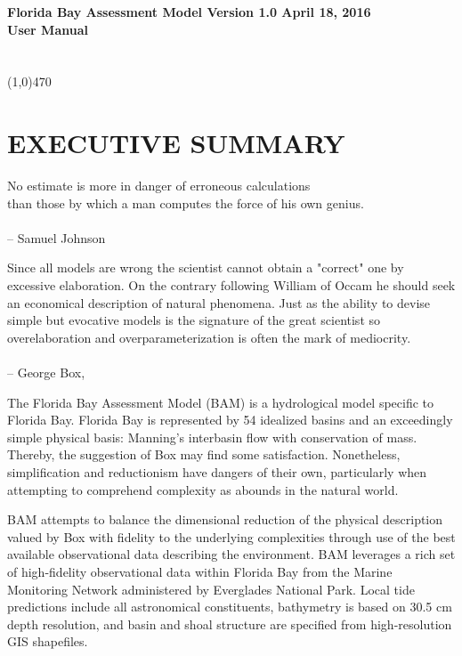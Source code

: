 \sffamily
\Large
\noindent\textbf{Florida Bay Assessment Model Version 1.0 April 18, 2016}
\\[0.1in]
\noindent\textbf{User Manual}
\\[0.1in]
\normalsize
{}
\\[0.05in]
\\[0.1in]
\noindent\line(1,0){470}

\section*{EXECUTIVE SUMMARY}
\rmfamily
\large

No estimate is more in danger of erroneous calculations\\
than those by which a man computes the force of his own genius.\\
\\-- Samuel Johnson

Since all models are wrong the scientist cannot obtain a "correct" one by excessive elaboration. On the contrary following William of Occam he should seek an economical description of natural phenomena. Just as the ability to devise simple but evocative models is the signature of the great scientist so overelaboration and overparameterization is often the mark of mediocrity.\\
\\-- George Box, \citep{Box1976}

The Florida Bay Assessment Model (BAM) is a hydrological model specific to Florida Bay.  Florida Bay is represented by 54 idealized basins and an exceedingly simple physical basis: Manning's interbasin flow with conservation of mass.  Thereby, the suggestion of Box may find some satisfaction.  Nonetheless, simplification and reductionism have dangers of their own, particularly when attempting to comprehend complexity as abounds in the natural world.

BAM attempts to balance the dimensional reduction of the physical description valued by Box with fidelity to the underlying complexities through use of the best available observational data describing the environment.  BAM leverages a rich set of high-fidelity observational data within Florida Bay from the Marine Monitoring Network administered by Everglades National Park.  Local tide predictions include all astronomical constituents, bathymetry is based on 30.5 cm depth resolution, and basin and shoal structure are specified from high-resolution GIS shapefiles. 


